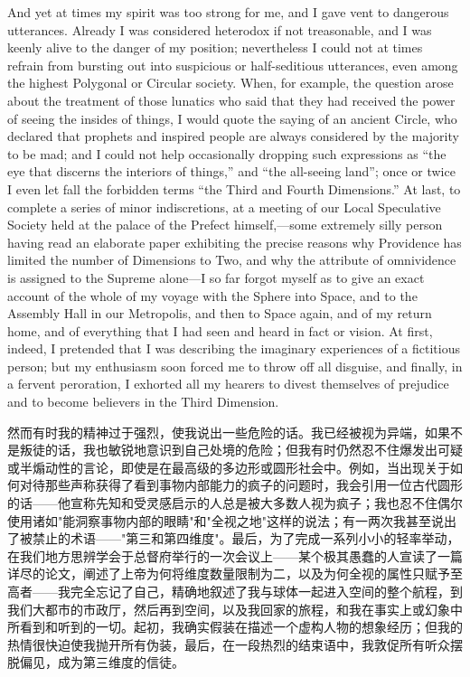\documentclass[12pt,UTF8]{ctexbook}
\begin{document}
And yet at times my spirit was too strong for me, and I gave vent to dangerous utterances. Already I was considered heterodox if not treasonable, and I was keenly alive to the danger of my position; nevertheless I could not at times refrain from bursting out into suspicious or half-seditious utterances, even among the highest Polygonal or Circular society. When, for example, the question arose about the treatment of those lunatics who said that they had received the power of seeing the insides of things, I would quote the saying of an ancient Circle, who declared that prophets and inspired people are always considered by the majority to be mad; and I could not help occasionally dropping such expressions as ``the eye that discerns the interiors of things,'' and ``the all-seeing land''; once or twice I even let fall the forbidden terms ``the Third and Fourth Dimensions.'' At last, to complete a series of minor indiscretions, at a meeting of our Local Speculative Society held at the palace of the Prefect himself,---some extremely silly person having read an elaborate paper exhibiting the precise reasons why Providence has limited the number of Dimensions to Two, and why the attribute of omnividence is assigned to the Supreme alone---I so far forgot myself as to give an exact account of the whole of my voyage with the Sphere into Space, and to the Assembly Hall in our Metropolis, and then to Space again, and of my return home, and of everything that I had seen and heard in fact or vision. At first, indeed, I pretended that I was describing the imaginary experiences of a fictitious person; but my enthusiasm soon forced me to throw off all disguise, and finally, in a fervent peroration, I exhorted all my hearers to divest themselves of prejudice and to become believers in the Third Dimension.

然而有时我的精神过于强烈，使我说出一些危险的话。我已经被视为异端，如果不是叛徒的话，我也敏锐地意识到自己处境的危险；但我有时仍然忍不住爆发出可疑或半煽动性的言论，即使是在最高级的多边形或圆形社会中。例如，当出现关于如何对待那些声称获得了看到事物内部能力的疯子的问题时，我会引用一位古代圆形的话——他宣称先知和受灵感启示的人总是被大多数人视为疯子；我也忍不住偶尔使用诸如"能洞察事物内部的眼睛"和"全视之地"这样的说法；有一两次我甚至说出了被禁止的术语——"第三和第四维度"。最后，为了完成一系列小小的轻率举动，在我们地方思辨学会于总督府举行的一次会议上——某个极其愚蠢的人宣读了一篇详尽的论文，阐述了上帝为何将维度数量限制为二，以及为何全视的属性只赋予至高者——我完全忘记了自己，精确地叙述了我与球体一起进入空间的整个航程，到我们大都市的市政厅，然后再到空间，以及我回家的旅程，和我在事实上或幻象中所看到和听到的一切。起初，我确实假装在描述一个虚构人物的想象经历；但我的热情很快迫使我抛开所有伪装，最后，在一段热烈的结束语中，我敦促所有听众摆脱偏见，成为第三维度的信徒。
\end{document}

